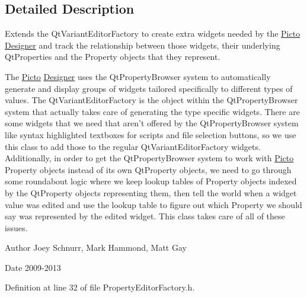 \subsection{Detailed Description}
Extends the Qt\-Variant\-Editor\-Factory to create extra widgets needed by the \hyperlink{namespace_picto}{Picto} \hyperlink{class_designer}{Designer} and track the relationship between those widgets, their underlying Qt\-Properties and the Property objects that they represent. 

The \hyperlink{namespace_picto}{Picto} \hyperlink{class_designer}{Designer} uses the Qt\-Property\-Browser system to automatically generate and display groups of widgets tailored specifically to different types of values. The Qt\-Variant\-Editor\-Factory is the object within the Qt\-Property\-Browser system that actually takes care of generating the type specific widgets. There are some widgets that we need that aren't offered by the Qt\-Property\-Browser system like syntax highlighted textboxes for scripts and file selection buttons, so we use this class to add those to the regular Qt\-Variant\-Editor\-Factory widgets. Additionally, in order to get the Qt\-Property\-Browser system to work with \hyperlink{namespace_picto}{Picto} Property objects instead of its own Qt\-Property objects, we need to go through some roundabout logic where we keep lookup tables of Property objects indexed by the Qt\-Property objects representing them, then tell the world when a widget value was edited and use the lookup table to figure out which Property we should say was represented by the edited widget. This class takes care of all of these issues. \begin{DoxyAuthor}{Author}
Joey Schnurr, Mark Hammond, Matt Gay 
\end{DoxyAuthor}
\begin{DoxyDate}{Date}
2009-\/2013 
\end{DoxyDate}


Definition at line 32 of file Property\-Editor\-Factory.\-h.



